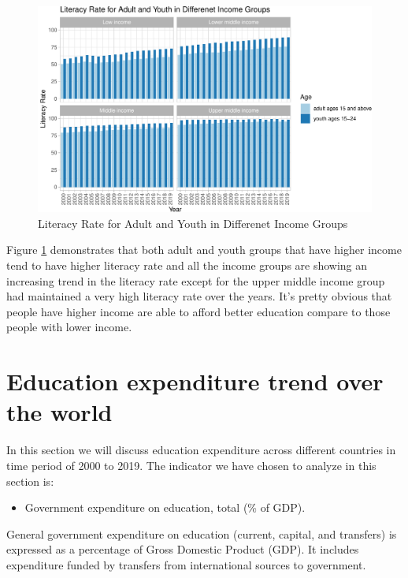 \documentclass[11pt,a4paper,]{article}
\providecommand{\tightlist}{%
  \setlength{\itemsep}{0pt}\setlength{\parskip}{0pt}}
\begin{document}
\begin{figure}
\centering
\includegraphics{report_files/figure-latex/income-my-1.pdf}
\caption{\label{fig:income-my}Literacy Rate for Adult and Youth in Differenet Income Groups}
\end{figure}

Figure \ref{fig:income-my} demonstrates that both adult and youth groups that have higher income tend to have higher literacy rate and all the income groups are showing an increasing trend in the literacy rate except for the upper middle income group had maintained a very high literacy rate over the years. It's pretty obvious that people have higher income are able to afford better education compare to those people with lower income.
\clearpage

\section*{Education expenditure trend over the world}

In this section we will discuss education expenditure across different countries in time period of 2000 to 2019. The indicator we have chosen to analyze in this section is:

\begin{itemize}
\tightlist
\item
  Government expenditure on education, total (\% of GDP).
\end{itemize}

General government expenditure on education (current, capital, and transfers) is expressed as a percentage of Gross Domestic Product (GDP). It includes expenditure funded by transfers from international sources to government.
\end{document}
